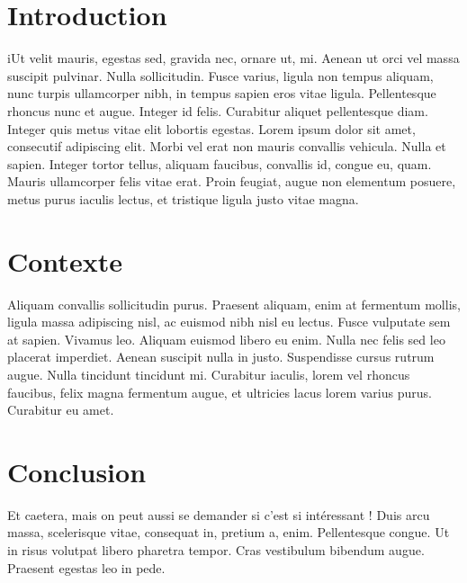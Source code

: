 \documentclass{article}
\begin{document}

\section{Introduction}
iUt velit mauris, egestas sed, gravida nec, ornare ut, mi. Aenean ut orci vel massa suscipit pulvinar. Nulla sollicitudin. Fusce varius, ligula non tempus aliquam, nunc turpis ullamcorper nibh, in tempus sapien eros vitae ligula. Pellentesque rhoncus nunc et augue. Integer id felis. Curabitur aliquet pellentesque diam. Integer quis metus vitae elit lobortis egestas. Lorem ipsum dolor sit amet, consecutif adipiscing elit. Morbi vel erat non mauris convallis vehicula. Nulla et sapien. Integer tortor tellus, aliquam faucibus, convallis id, congue eu, quam. Mauris ullamcorper felis vitae erat. Proin feugiat, augue non elementum posuere, metus purus iaculis lectus, et tristique ligula justo vitae magna.
\section{Contexte}
 Aliquam convallis sollicitudin purus. Praesent aliquam, enim at fermentum mollis, ligula massa adipiscing nisl, ac euismod nibh nisl eu lectus. Fusce vulputate sem at sapien. Vivamus leo. Aliquam euismod libero eu enim. Nulla nec felis sed leo placerat imperdiet. Aenean suscipit nulla in justo. Suspendisse cursus rutrum augue. Nulla tincidunt tincidunt mi. Curabitur iaculis, lorem vel rhoncus faucibus, felix magna fermentum augue, et ultricies lacus lorem varius purus. Curabitur eu amet. 
\section{Conclusion}
Et caetera, mais on peut aussi se demander si c'est si intéressant !
Duis arcu massa, scelerisque vitae, consequat in, pretium a, enim. Pellentesque congue. Ut in risus volutpat libero pharetra tempor. Cras vestibulum bibendum augue. Praesent egestas leo in pede. 
\end{document}
